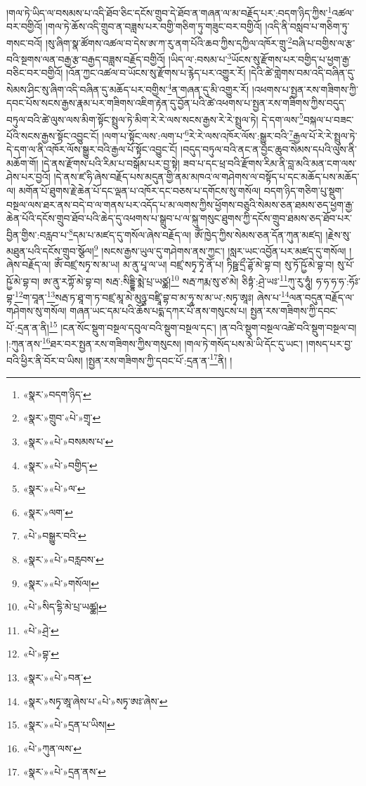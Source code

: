 །གལ་ཏེ་ཡིད་ལ་བསམས་པ་འདི་ཐོབ་ཅིང་དངོས་གྲུབ་དེ་ཐོབ་ན་གཞན་ལ་མ་བརྗོད་པར་:བདག་ཉིད་ཀྱིས་\footnote{«སྣར་»བདག་ཉིད་}འཚལ་བར་བགྱིའོ། །གལ་ཏེ་ཆོས་འདི་གྲུབ་ན་བཟླས་པར་བགྱི་གཅིག་ཏུ་གཟུང་བར་བགྱིའོ། །འདི་ནི་བསླབ་པ་གཅིག་ཏུ་གསང་བའོ། །སུ་ཞིག་སྣ་ཚོགས་འཚལ་བ་དེས་ཨ་ཀ་རུ་ནག་པོའི་ཆབ་ཀྱིས་དཀྱིལ་འཁོར་གྲུ་\footnote{«སྣར་»གྲུབ་«པེ་»གྲྭ་}བཞི་པ་བགྱིས་ལ་རྩ་བའི་སྔགས་ལན་བརྒྱ་རྩ་བརྒྱད་བཟླས་བརྗོད་བགྱིའོ། །ཡིད་ལ་:བསམ་པ་\footnote{«སྣར་»«པེ་»བསམས་པ་}ཡོངས་སུ་རྫོགས་པར་བགྱིད་པ་ཕྱག་རྒྱ་བཅིང་བར་བགྱིའོ། །འོན་ཀྱང་འཚལ་བ་ཡོངས་སུ་རྫོགས་པ་རྙེད་པར་འགྱུར་རོ། །དེའི་ཚེ་གླེགས་བམ་འདི་བཞིན་དུ་སེམས་ཤིང་སུ་ཞིག་འདི་བཞིན་དུ་མཆོད་པར་བགྱིས་\footnote{«སྣར་»«པེ་»བགྱིད་}ན་གཞན་དུ་མི་འགྱུར་རོ། །འཕགས་པ་སྤྱན་རས་གཟིགས་ཀྱི་དབང་པོས་སངས་རྒྱས་རྣམ་པར་གཟིགས་འཇིག་རྟེན་དུ་བྱོན་པའི་ཚེ་འཕགས་པ་སྤྱན་རས་གཟིགས་ཀྱིས་བདུད་བཏུལ་བའི་ཚེ་ལུས་ལས་མིག་སྟོང་སྤྲུལ་ཏེ་མིག་རེ་རེ་ལས་སངས་རྒྱས་རེ་རེ་སྤྲུལ་ཏེ། དེ་དག་ལས་\footnote{«སྣར་»«པེ་»ལ་}བསྐལ་པ་བཟང་པོའི་སངས་རྒྱས་སྟོང་འབྱུང་ངོ། །ལག་པ་སྟོང་ལས་:ལག་པ་\footnote{«སྣར་»ལག་}རེ་རེ་ལས་འཁོར་ལོས་:སྒྱུར་བའི་\footnote{«པེ་»བསྒྱུར་བའི་}རྒྱལ་པོ་རེ་རེ་སྤྲུལ་ཏེ་དེ་དག་ལ་ནི་འཁོར་ལོས་སྒྱུར་བའི་རྒྱལ་པོ་སྟོང་འབྱུང་ངོ། །བདུད་བཏུལ་བའི་ནང་ན་བྱང་ཆུབ་སེམས་དཔའི་ལུས་ནི་མཆོག་གོ། །དེ་ནས་རྫོགས་པའི་རིམ་པ་བསྒོམ་པར་བྱ་སྟེ། ཟབ་པ་དང་ཕྲ་བའི་རྫོགས་རིམ་ནི་བླ་མའི་མན་ངག་ལས་ཤེས་པར་བྱའོ། །དེ་ནས་ཛ་ཧི་ཞེས་བརྗོད་པས་མདུན་གྱི་ནམ་མཁའ་ལ་གཤེགས་ལ་བསྟོད་པ་དང་མཆོད་པས་མཆོད་ལ། མགོན་པོ་ཐུགས་རྗེ་ཆེན་པོ་དང་ལྡན་པ་འཁོར་དང་བཅས་པ་དགོངས་སུ་གསོལ། བདག་ཉིད་གཅིག་པུ་སྡུག་བསྔལ་ལས་ཐར་ནས་བདེ་བ་ལ་གནས་པར་འདོད་པ་མ་ལགས་ཀྱིས་ཕྱོགས་བཅུའི་སེམས་ཅན་ཐམས་ཅད་ཕྱག་རྒྱ་ཆེན་པོའི་དངོས་གྲུབ་ཐོབ་པའི་ཆེད་དུ་འཕགས་པ་སྒྲུབ་པ་ལ་སྐུ་གསུང་ཐུགས་ཀྱི་དངོས་གྲུབ་ཐམས་ཅད་ཐོབ་པར་བྱིན་གྱིས་:བརླབ་པ་\footnote{«སྣར་»«པེ་»བརླབས་}དམ་པ་མཛད་དུ་གསོལ་ཞེས་བརྗོད་ལ། ཨོཾ་ཁྱེད་ཀྱིས་སེམས་ཅན་དོན་ཀུན་མཛད། །རྗེས་སུ་མཐུན་པའི་དངོས་གྲུབ་སྩོལ།\footnote{«སྣར་»«པེ་»གསོལ།} །སངས་རྒྱས་ཡུལ་དུ་གཤེགས་ནས་ཀྱང་། །སླར་ཡང་འབྱོན་པར་མཛད་དུ་གསོལ། །ཞེས་བརྗོད་ལ། ཨོཾ་བཛྲ་སཏྭ་ས་མ་ཡ། མ་ནུ་པཱ་ལ་ཡ། བཛྲ་སཏྭ་ཏྭེ་ནོ་པ། ཏིཥྛ་དྲྀ་ཌྷོ་མེ་བྷ་བ། སུ་ཏོ་ཥྱོ་མེ་བྷ་བ། སུ་པོ་ཥྱོ་མེ་བྷ་བ། ཨ་ནུ་རཀྟོ་མེ་བྷ་བ། སརྦ་:སིདྡྷི་མྨེ་པྲ་ཡཙྪ།\footnote{«པེ་»སིད་དྷི་མེ་པྲ་ཡཚྪ།} སརྦ་ཀརྨ་སུ་ཙ་མེ། ཅིཏྟཾ་:ཤྲེ་ཡཿ་\footnote{«པེ་»ཤྲེ་}ཀུ་རུ་ཧཱུཾ། ཧ་ཧ་ཧ་ཧ་:ཧོཿ་བྷ་\footnote{«པེ་»བྷ་}ག་བཱན་\footnote{«སྣར་»«པེ་»བན་}སརྦ་ཏ་ཐཱ་ག་ཏ་བཛྲ་མཱ་མེ་མུཉྩ་བཛྲཱི་བྷ་བ་མ་ཧཱ་ས་མ་ཡ་:སཏྭ་ཨཱཿ། ཞེས་པ་\footnote{«སྣར་»སཏྭ་ཨཱ་ཞེས་པ་«པེ་»སཏྭ་ཨཿ་ཞེས་}ལན་བདུན་བརྗོད་ལ་གཤེགས་སུ་གསོལ། གཞན་ཡང་དམ་པའི་ཆོས་པདྨ་དཀར་པོ་ནས་གསུངས་པ། སྤྱན་རས་གཟིགས་ཀྱི་དབང་པོ་:དྲན་ན་ནི།\footnote{«སྣར་»«པེ་»དྲན་པ་ཡིས།} །ངན་སོང་སྡུག་བསྔལ་དབུལ་བའི་སྡུག་བསྔལ་དང་། །ན་བའི་སྡུག་བསྔལ་འཚེ་བའི་སྡུག་བསྔལ་བ། །:ཀུན་ནས་\footnote{«པེ་»ཀུན་ལས་}ཐར་བར་སྤྱན་རས་གཟིགས་ཀྱིས་གསུངས། །གལ་ཏེ་གསོད་པས་མེ་ཡི་དོང་དུ་ཡང་། །གསད་པར་བྱ་བའི་ཕྱིར་ནི་བོར་བ་ཡིས། །སྤྱན་རས་གཟིགས་ཀྱི་དབང་པོ་:དྲན་ན་\footnote{«སྣར་»«པེ་»དྲན་ནས་}ནི། །
